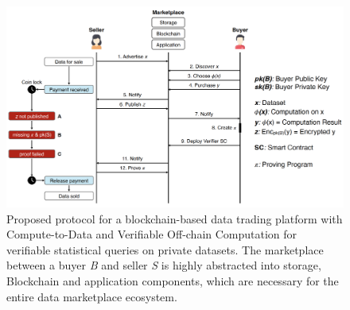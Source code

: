 

\begin{figure}[!htb]
    \centering
    \includegraphics[width=14cm]{images/protocol.png}
    \caption{Proposed protocol for a blockchain-based data trading platform with Compute-to-Data and Verifiable Off-chain Computation for verifiable statistical queries on private datasets. The marketplace between a buyer \emph{B} and seller \emph{S} is highly abstracted into storage, Blockchain and application components, which are necessary for the entire data marketplace ecosystem.}
    \label{fig:usecase}
\end{figure}


